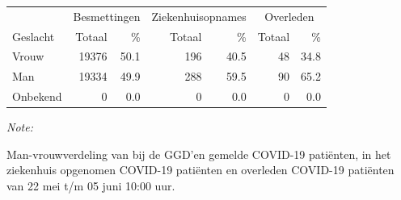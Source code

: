 \documentclass[
  english,
  man,floatsintext]{apa6}
\begin{document}
\begin{table}
\centering\begingroup\fontsize{11}{13}\selectfont

\begin{threeparttable}
\begin{tabular}{lrrrrrr}
\toprule
\multicolumn{1}{c}{ } & \multicolumn{2}{c}{Besmettingen} & \multicolumn{2}{c}{Ziekenhuisopnames} & \multicolumn{2}{c}{Overleden} \\
\cmidrule(l{3pt}r{3pt}){2-3} \cmidrule(l{3pt}r{3pt}){4-5} \cmidrule(l{3pt}r{3pt}){6-7}
Geslacht & Totaal & \% & Totaal & \% & Totaal & \%\\
\midrule
Vrouw & 19376 & 50.1 & 196 & 40.5 & 48 & 34.8\\
Man & 19334 & 49.9 & 288 & 59.5 & 90 & 65.2\\
Onbekend & 0 & 0.0 & 0 & 0.0 & 0 & 0.0\\
\bottomrule
\end{tabular}
\begin{tablenotes}
\item \textit{Note: } 
\item Man-vrouwverdeling van bij de GGD’en gemelde COVID-19 patiënten, in het ziekenhuis opgenomen COVID-19 patiënten en overleden COVID-19 patiënten van 22 mei t/m 05 juni 10:00 uur.
\end{tablenotes}
\end{threeparttable}
\endgroup{}
\end{table}
\newpage
\end{document}
